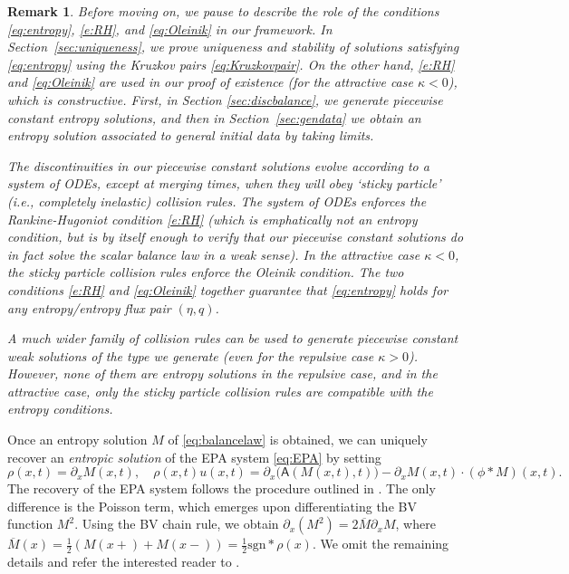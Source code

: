 \documentclass[10pt,a4paper]{amsart}
\newtheorem{remark}{Remark}
\def\pa{\partial}
\def\A{\mathsf{A}}
\begin{document}
	\begin{remark}
		\label{rem:entconds}
		Before moving on, we pause to describe the role of the conditions \eqref{eq:entropy}, \eqref{e:RH}, and \eqref{eq:Oleinik} in our framework.  
		In Section~\ref{sec:uniqueness}, we prove uniqueness and stability of solutions satisfying \eqref{eq:entropy} using the Kruzkov pairs \eqref{eq:Kruzkovpair}.  On the other hand, \eqref{e:RH} and \eqref{eq:Oleinik} are used in our proof of existence (for the attractive case $\kappa<0$), which is constructive.  First, in Section \ref{sec:discbalance}, we generate piecewise constant entropy solutions, and then in Section~\ref{sec:gendata} we obtain an entropy solution associated to general initial data by taking limits.  
		
		The discontinuities in our piecewise constant solutions evolve according to a system of ODEs, except at merging times, when they will obey `sticky particle' (i.e., completely inelastic) collision rules.  The system of ODEs enforces the Rankine-Hugoniot condition \eqref{e:RH} (which is emphatically not an entropy condition, but is by itself enough to verify that our piecewise constant solutions do in fact solve the scalar balance law in a weak sense).  In the attractive case $\kappa<0$, the sticky particle collision rules  enforce the Oleinik condition.
		The two conditions \eqref{e:RH} and \eqref{eq:Oleinik} together guarantee that \eqref{eq:entropy} holds for any entropy/entropy flux pair $(\eta, q)$.  
		
		A much wider family of collision rules can be used to generate piecewise constant weak solutions of the type we generate (even for the repulsive case $\kappa>0$). However, none of them are entropy solutions in the repulsive case, and in the attractive case, only the sticky particle collision rules are compatible with the entropy conditions.
	\end{remark}
	
	
	Once an entropy solution $M$ of \eqref{eq:balancelaw}  is obtained, we can uniquely recover an \emph{entropic solution} of the EPA system \eqref{eq:EPA} by setting
	\[
	\rho(x,t) = \pa_x M(x,t),\quad \rho(x,t) u(x,t) = \pa_x\big(\A(M(x,t),t)\big) - \pa_x M(x,t)\cdot(\phi\ast M)(x,t). 
	\]
	The recovery of the EPA system follows the procedure outlined in  \cite{leslie2023sticky}.  The only difference is the Poisson term, which emerges upon differentiating the BV function $M^2$.  Using the BV chain rule, we obtain $\partial_x(M^2) = 2\overline{M} \partial_x M$, where $\overline{M}(x) = \frac12 (M(x+) + M(x-)) = \frac12 \mathrm{sgn}*\rho(x)$.  We omit the remaining details and refer the interested reader to \cite{leslie2023sticky}.
	
\end{document}

